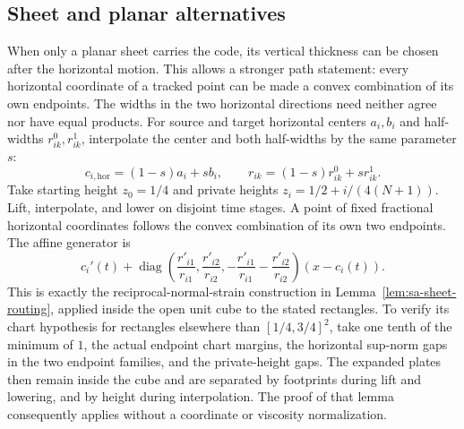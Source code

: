 \subsection{Sheet and planar alternatives}
\label{subsec:sb-sheets}
When only a planar sheet carries the code, its vertical thickness can
be chosen after the horizontal motion. This allows a stronger path
statement: every horizontal coordinate of a tracked point can be made
a convex combination of its own endpoints. The widths in the two
horizontal directions need neither agree nor have equal products.  For source and target horizontal centers $a_i,b_i$ and half-widths $r_{ik}^0,r_{ik}^1$, interpolate the center and both half-widths by the same parameter $s$:
\[
 c_{i,\mathrm{hor}}=(1-s)a_i+sb_i,\qquad
 r_{ik}=(1-s)r_{ik}^0+sr_{ik}^1.
\]
Take starting height $z_0=1/4$ and private heights $z_i=1/2+i/(4(N+1))$.  Lift, interpolate, and lower on disjoint time stages.  A point of fixed fractional horizontal coordinates follows the convex combination of its own two endpoints.  The affine generator is
\[
 c_i'(t)+\operatorname{diag}\left(\frac{r'_{i1}}{r_{i1}},
 \frac{r'_{i2}}{r_{i2}},-\frac{r'_{i1}}{r_{i1}}-\frac{r'_{i2}}{r_{i2}}\right)(x-c_i(t)).
\]
This is exactly the reciprocal-normal-strain construction in Lemma~\ref{lem:sa-sheet-routing}, applied inside the open unit cube to the stated rectangles.  To verify its chart hypothesis for rectangles elsewhere than $[1/4,3/4]^2$, take one tenth of the minimum of $1$, the actual endpoint chart margins, the horizontal sup-norm gaps in the two endpoint families, and the private-height gaps.  The expanded plates then remain inside the cube and are separated by footprints during lift and lowering, and by height during interpolation.  The proof of that lemma consequently applies without a coordinate or viscosity normalization.

